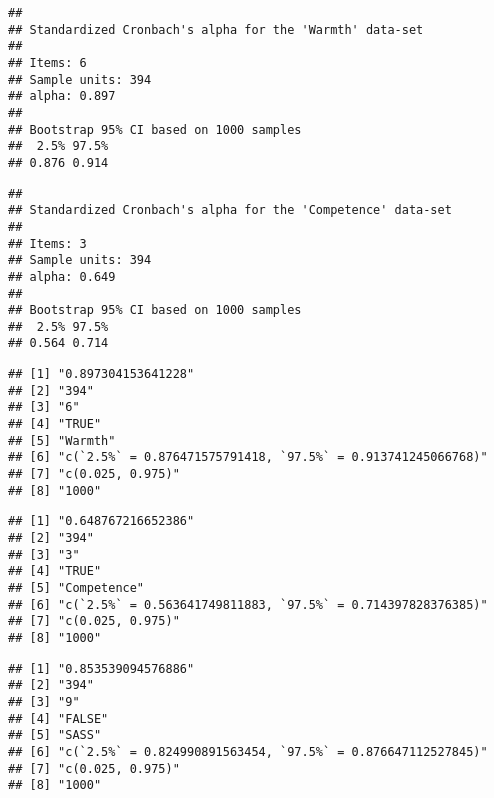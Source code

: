 \documentclass[
  doc,draftall]{apa6}
\begin{document}
\begin{verbatim}
## 
## Standardized Cronbach's alpha for the 'Warmth' data-set
## 
## Items: 6
## Sample units: 394
## alpha: 0.897
## 
## Bootstrap 95% CI based on 1000 samples
##  2.5% 97.5% 
## 0.876 0.914
\end{verbatim}

\begin{verbatim}
## 
## Standardized Cronbach's alpha for the 'Competence' data-set
## 
## Items: 3
## Sample units: 394
## alpha: 0.649
## 
## Bootstrap 95% CI based on 1000 samples
##  2.5% 97.5% 
## 0.564 0.714
\end{verbatim}

\begin{verbatim}
## [1] "0.897304153641228"                                         
## [2] "394"                                                       
## [3] "6"                                                         
## [4] "TRUE"                                                      
## [5] "Warmth"                                                    
## [6] "c(`2.5%` = 0.876471575791418, `97.5%` = 0.913741245066768)"
## [7] "c(0.025, 0.975)"                                           
## [8] "1000"
\end{verbatim}

\begin{verbatim}
## [1] "0.648767216652386"                                         
## [2] "394"                                                       
## [3] "3"                                                         
## [4] "TRUE"                                                      
## [5] "Competence"                                                
## [6] "c(`2.5%` = 0.563641749811883, `97.5%` = 0.714397828376385)"
## [7] "c(0.025, 0.975)"                                           
## [8] "1000"
\end{verbatim}

\begin{verbatim}
## [1] "0.853539094576886"                                         
## [2] "394"                                                       
## [3] "9"                                                         
## [4] "FALSE"                                                     
## [5] "SASS"                                                      
## [6] "c(`2.5%` = 0.824990891563454, `97.5%` = 0.876647112527845)"
## [7] "c(0.025, 0.975)"                                           
## [8] "1000"
\end{verbatim}
\end{document}
